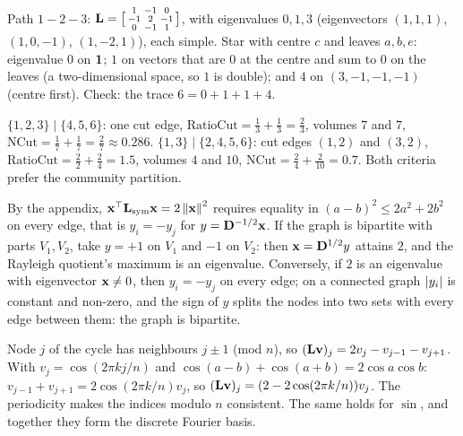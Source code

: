 \section{}

Path $1 - 2 - 3$: $\mathbf{L} = \bigl[\begin{smallmatrix}1&-1&0\\-1&2&-1\\0&-1&1\end{smallmatrix}\bigr]$, with eigenvalues $0, 1, 3$ (eigenvectors $(1, 1, 1)$, $(1, 0, -1)$, $(1, -2, 1)$), each simple. Star with centre $c$
and leaves $a, b, e$: eigenvalue $0$ on $\mathbf{1}$; $1$ on vectors that are $0$ at the centre and sum to $0$ on the leaves (a
two-dimensional space, so $1$ is double); and $4$ on $(3, -1, -1, -1)$ (centre first). Check: the trace $6 = 0 + 1 + 1 + 4$.

$\{1, 2, 3\}\mid\{4, 5, 6\}$: one cut edge, $\text{RatioCut} = \frac13 + \frac13 = \frac23$, volumes $7$ and $7$, $\text{NCut} = \frac17 + \frac17 = \frac27\approx0.286$.
$\{1, 3\}\mid\{2, 4, 5, 6\}$: cut edges $(1, 2)$ and $(3, 2)$, $\text{RatioCut} = \frac22 + \frac24 = 1.5$, volumes $4$ and $10$, $\text{NCut} = \frac24 + \frac2{10} = 0.7$. Both criteria
prefer the community partition.

By the appendix, $\mathbf{x}^\top\mathbf{L}_{\text{sym}}\mathbf{x} = 2\left\|\mathbf{x}\right\|^2$ requires equality in $(a - b)^2\leq2a^2 + 2b^2$ on every edge, that is $y_i = -y_j$ for $y = \mathbf{D}^{-1/2}\mathbf{x}$.
If the graph is bipartite with parts $V_1, V_2$, take $y = +1$ on $V_1$ and $-1$ on $V_2$: then $\mathbf{x} = \mathbf{D}^{1/2}y$ attains $2$, and the Rayleigh
quotient's maximum is an eigenvalue. Conversely, if $2$ is an eigenvalue with eigenvector $\mathbf{x}\neq0$, then $y_i = -y_j$ on every edge;
on a connected graph $\left|y_i\right|$ is constant and non-zero, and the sign of $y$ splits the nodes into two sets with every
edge between them: the graph is bipartite.

Node $j$ of the cycle has neighbours $j\pm1$ (mod $n$), so $(\mathbf{L}\mathbf{v})_j = 2v_j - v_{j-1} - v_{j+1}$. With $v_j = \cos(2\pi kj/n)$ and
$\cos(a - b) + \cos(a + b) = 2\cos a\cos b$: $v_{j-1} + v_{j+1} = 2\cos(2\pi k/n)v_j$, so $(\mathbf{L}\mathbf{v})_j = (2 - 2\cos(2\pi k/n))v_j$. The periodicity makes the
indices modulo $n$ consistent. The same holds for $\sin$, and together they form the discrete Fourier basis.


